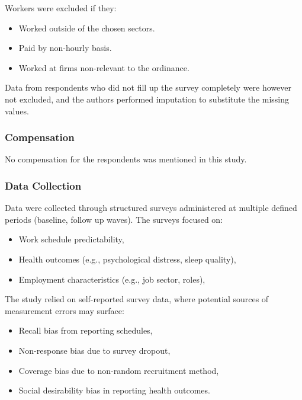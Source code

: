 \documentclass{article}
\begin{document}
 	Workers were excluded if they:
 	
	\begin{itemize}
 		\item Worked outside of the chosen sectors.
 		\item Paid by non-hourly basis.
 		\item Worked at firms non-relevant to the ordinance.
 	\end{itemize}
 	
 	Data from respondents who did not fill up the survey completely were however not excluded, and the authors performed imputation to substitute the missing values.
 	
 	\subsubsection{Compensation}
 	
 	No compensation for the respondents was mentioned in this study.
 	
 	\subsubsection{Data Collection}
 	
 	Data were collected through structured surveys administered at multiple defined periods (baseline, follow up waves). The surveys focused on:
 	
	\begin{itemize}
 		\item Work schedule predictability,
 		\item Health outcomes (e.g., psychological distress, sleep quality),
 		\item Employment characteristics (e.g., job sector, roles),
 	\end{itemize} 
 	
 	The study relied on self-reported survey data, where potential sources of measurement errors may surface:
 	
	\begin{itemize}
 		\item Recall bias from reporting schedules,
 		\item Non-response bias due to survey dropout,
 		\item Coverage bias due to non-random recruitment method,
 		\item Social desirability bias in reporting health outcomes.
 	\end{itemize} 
 	
\end{document}
